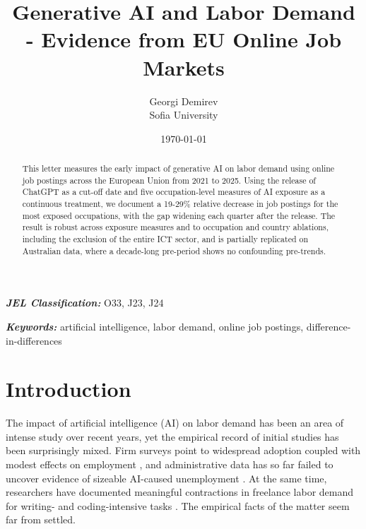\documentclass[11pt]{article}
\newcommand{\JEL}[1]{\textbf{\textit{JEL Classification:}} #1}
\newcommand{\Keywords}[1]{\textbf{\textit{Keywords:}} #1}
\begin{document}
\title{Generative AI and Labor Demand - Evidence from EU Online Job Markets}
\author{Georgi Demirev \\ Sofia University}
\date{\today}
\maketitle

\begin{abstract}
This letter measures the early impact of generative AI on labor demand using online job postings across the European Union from 2021 to 2025. Using the release of ChatGPT as a cut-off date and five occupation-level measures of AI exposure as a continuous treatment, we document a 19-29\% relative decrease in job postings for the most exposed occupations, with the gap widening each quarter after the release. The result is robust across exposure measures and to occupation and country ablations, including the exclusion of the entire ICT sector, and is partially replicated on Australian data, where a decade-long pre-period shows no confounding pre-trends.
\end{abstract}

\JEL{O33, J23, J24}

\Keywords{artificial intelligence, labor demand, online job postings, difference-in-differences}


\section{Introduction}

The impact of artificial intelligence (AI) on labor demand has been an area of intense study over recent years, yet the empirical record of initial studies has been surprisingly mixed. Firm surveys point to widespread adoption coupled with modest effects on employment \citep{yotzov2026firmdata}, and administrative data has so far failed to uncover evidence of sizeable AI-caused unemployment \citep{humlum2025stillwaters}. At the same time, researchers have documented meaningful contractions in freelance labor demand for writing- and coding-intensive tasks \citep{demirci2025replacing, hui2023shortterm}. The empirical facts of the matter seem far from settled.
\end{document}
